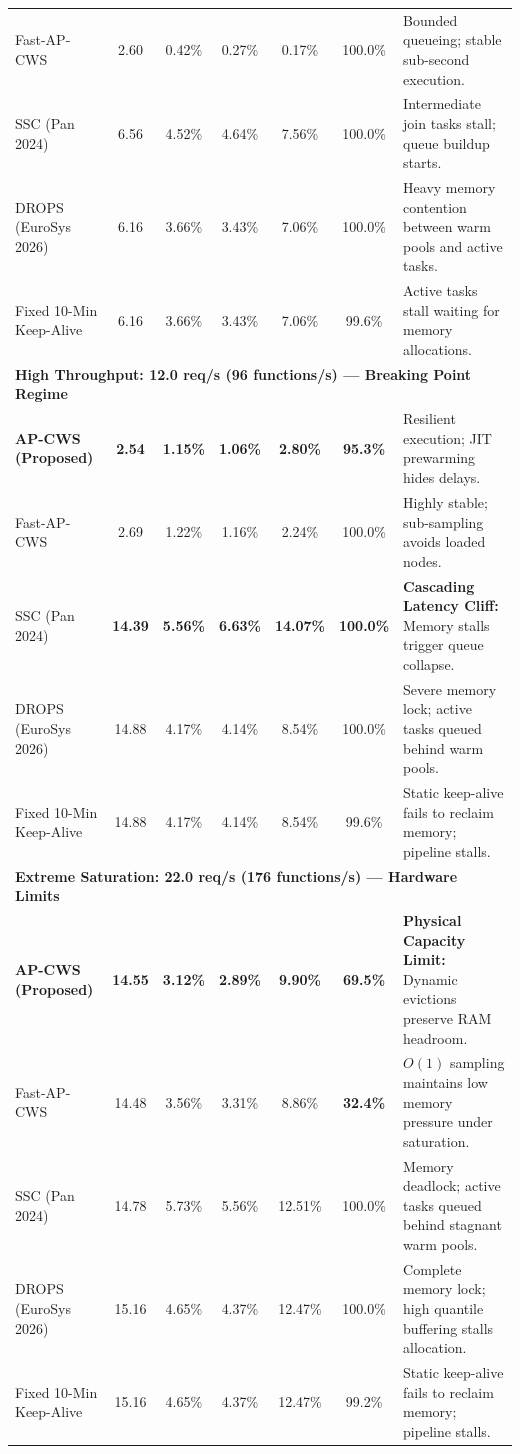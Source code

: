 \documentclass[conference]{IEEEtran}
\begin{document}
\begin{table}[t]
{\begin{tabular}{l c c c c c p{6.5cm}}
Fast-AP-CWS & 2.60 & 0.42\% & 0.27\% & 0.17\% & 100.0\% & Bounded queueing; stable sub-second execution. \\
\rowcolor{tablerowalt}
SSC (Pan 2024) & 6.56 & 4.52\% & 4.64\% & 7.56\% & 100.0\% & Intermediate join tasks stall; queue buildup starts. \\
DROPS (EuroSys 2026) & 6.16 & 3.66\% & 3.43\% & 7.06\% & 100.0\% & Heavy memory contention between warm pools and active tasks. \\
\rowcolor{tablerowalt}
Fixed 10-Min Keep-Alive & 6.16 & 3.66\% & 3.43\% & 7.06\% & 99.6\% & Active tasks stall waiting for memory allocations. \\
\midrule
\multicolumn{7}{l}{\textbf{\color{ieeeblue} High Throughput: 12.0 req/s (96 functions/s) --- Breaking Point Regime}} \\
\midrule
\rowcolor{highlightgreen}\textbf{AP-CWS (Proposed)} & \textbf{2.54} & \textbf{1.15\%} & \textbf{1.06\%} & \textbf{2.80\%} & \textbf{95.3\%} & Resilient execution; JIT prewarming hides delays. \\
Fast-AP-CWS & 2.69 & 1.22\% & 1.16\% & 2.24\% & 100.0\% & Highly stable; sub-sampling avoids loaded nodes. \\
\rowcolor{highlightpink}SSC (Pan 2024) & \textbf{14.39} & \textbf{5.56\%} & \textbf{6.63\%} & \textbf{14.07\%} & \textbf{100.0\%} & \textbf{Cascading Latency Cliff:} Memory stalls trigger queue collapse. \\
DROPS (EuroSys 2026) & 14.88 & 4.17\% & 4.14\% & 8.54\% & 100.0\% & Severe memory lock; active tasks queued behind warm pools. \\
\rowcolor{tablerowalt}
Fixed 10-Min Keep-Alive & 14.88 & 4.17\% & 4.14\% & 8.54\% & 99.6\% & Static keep-alive fails to reclaim memory; pipeline stalls. \\
\midrule
\multicolumn{7}{l}{\textbf{\color{ieeeblue} Extreme Saturation: 22.0 req/s (176 functions/s) --- Hardware Limits}} \\
\midrule
\rowcolor{highlightgreen}\textbf{AP-CWS (Proposed)} & \textbf{14.55} & \textbf{3.12\%} & \textbf{2.89\%} & \textbf{9.90\%} & \textbf{69.5\%} & \textbf{Physical Capacity Limit:} Dynamic evictions preserve RAM headroom. \\
Fast-AP-CWS & 14.48 & 3.56\% & 3.31\% & 8.86\% & \textbf{32.4\%} & $O(1)$ sampling maintains low memory pressure under saturation. \\
\rowcolor{tablerowalt}
SSC (Pan 2024) & 14.78 & 5.73\% & 5.56\% & 12.51\% & 100.0\% & Memory deadlock; active tasks queued behind stagnant warm pools. \\
DROPS (EuroSys 2026) & 15.16 & 4.65\% & 4.37\% & 12.47\% & 100.0\% & Complete memory lock; high quantile buffering stalls allocation. \\
\rowcolor{tablerowalt}
Fixed 10-Min Keep-Alive & 15.16 & 4.65\% & 4.37\% & 12.47\% & 99.2\% & Static keep-alive fails to reclaim memory; pipeline stalls. \\
\bottomrule
\end{tabular}%
}
\end{table}
\end{document}
